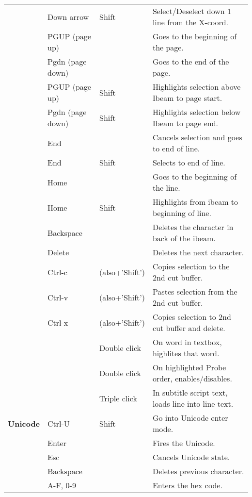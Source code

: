\begin{longtable}[h]{>{\bfseries}p{}p{}p{}p{}}
  & Down arrow & Shift & Select/Deselect down 1 line from the X-coord. \\
  & PGUP (page up) &  & Goes to the beginning of the page. \\
  & Pgdn (page down) &  & Goes to the end of the page. \\
  & PGUP (page up) & Shift & Highlights selection above Ibeam to page start. \\
  & Pgdn (page down) & Shift & Highlights selection below Ibeam to page end. \\
  & End &  & Cancels selection and goes to end of line. \\
  & End & Shift & Selects to end of line. \\
  & Home &  & Goes to the beginning of the line. \\
  & Home & Shift & Highlights from ibeam to beginning of line. \\
  & Backspace &  & Deletes the character in back of the ibeam. \\
  & Delete &  & Deletes the next character. \\
  & Ctrl-c & (also+’Shift’) & Copies selection to the 2nd cut buffer. \\
  & Ctrl-v & (also+’Shift’) & Pastes selection from the 2nd cut buffer. \\
  & Ctrl-x & (also+’Shift’) & Copies selection to 2nd cut buffer and delete. \\
  &  & Double click & On word in textbox, highlites that word. \\
  &  & Double click & On highlighted Probe order, enables/disables. \\
  &  & Triple click & In subtitle script text, loads line into line text. \\
  \midrule
  \textcolor{CinBlueText}{Unicode} & Ctrl-U & Shift & Go into Unicode enter mode. \\
  & Enter &  & Fires the Unicode. \\
  & Esc &  & Cancels Unicode state. \\
  & Backspace &  & Deletes previous character. \\
  & A-F, 0-9 &  & Enters the hex code. \\
  \bottomrule
\end{longtable}

